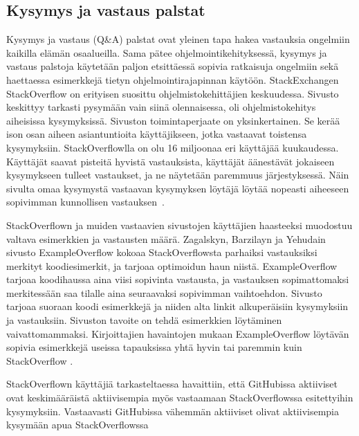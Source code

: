 \documentclass[finnish]{../tktltiki2}
\theoremstyle{definition}
\theoremstyle{remark}
\begin{document}
\subsection{Kysymys ja vastaus palstat}
Kysymys ja vastaus (Q\&A) palstat ovat yleinen tapa hakea vastauksia ongelmiin kaikilla elämän osaalueilla. Sama pätee ohjelmointikehityksessä, kysymys ja vastaus palstoja käytetään paljon etsittäessä sopivia ratkaisuja ongelmiin sekä haettaessa esimerkkejä tietyn ohjelmointirajapinnan käytöön. StackExchangen StackOverflow on erityisen suosittu ohjelmistokehittäjien keskuudessa. Sivusto keskittyy tarkasti pysymään vain siinä olennaisessa, oli ohjelmistokehitys aiheisissa kysymyksissä. Sivuston toimintaperjaate on yksinkertainen. Se kerää ison osan aiheen asiantuntioita käyttäjikseen, jotka vastaavat toistensa kysymyksiin. StackOverflowlla on olu 16 miljoonaa eri käyttäjää kuukaudessa. Käyttäjät saavat pisteitä hyvistä vastauksista, käyttäjät äänestävät jokaiseen kysymykseen tulleet vastaukset, ja ne näytetään paremmuus järjestyksessä. Näin sivulta omaa kysymystä vastaavan kysymyksen löytäjä löytää nopeasti aiheeseen sopivimman kunnollisen vastauksen~\cite{social-networking-meets-se}.

StackOverflown ja muiden vastaavien sivustojen käyttäjien haasteeksi muodostuu valtava esimerkkien ja vastausten määrä. Zagalskyn, Barzilayn ja Yehudain sivusto ExampleOverflow kokoaa StackOverflowsta parhaiksi vastauksiksi merkityt koodiesimerkit, ja tarjoaa optimoidun haun niistä. ExampleOverflow tarjoaa koodihaussa aina viisi sopivinta vastausta, ja vastauksen sopimattomaksi merkitessään saa tilalle aina seuraavaksi sopivimman vaihtoehdon. Sivusto tarjoaa suoraan koodi esimerkkejä ja niiden alta linkit alkuperäisiin kysymyksiin ja vastauksiin. Sivuston tavoite on tehdä esimerkkien löytäminen vaivattomammaksi. Kirjoittajien havaintojen mukaan ExampleOverflow löytävän sopivia esimerkkejä useissa tapauksissa yhtä hyvin tai paremmin kuin StackOverflow \cite{example-overflow-social-media-for-code-recommendations}.

StackOverflown käyttäjiä tarkasteltaessa havaittiin, että GitHubissa aktiiviset ovat keskimääräistä aktiivisempia myös vastaamaan StackOverflowssa esitettyihin kysymyksiin. Vastaavasti GitHubissa vähemmän aktiiviset olivat aktiivisempia kysymään apua StackOverflowssa~\cite{stackoverflow-and-github}

\end{document}
